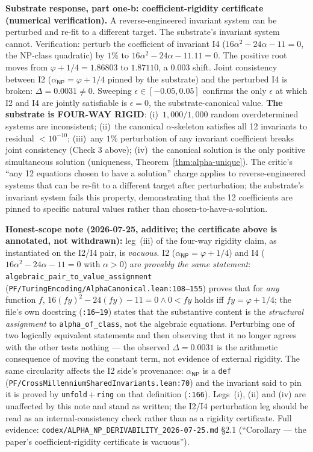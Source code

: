 \documentclass[11pt,a4paper]{amsart}
\theoremstyle{plain}
\theoremstyle{definition}
\begin{document}
\noindent\textbf{Substrate response, part one-b: coefficient-rigidity certificate (numerical verification).} A reverse-engineered invariant system can be perturbed and re-fit to a different target. The substrate's invariant system cannot. Verification: perturb the coefficient of invariant I4 ($16\alpha^2 - 24\alpha - 11 = 0$, the NP-class quadratic) by $1\%$ to $16\alpha^2 - 24\alpha - 11.11 = 0$. The positive root moves from $\varphi + 1/4 = 1.86803$ to $1.87110$, a $0.003$ shift. Joint consistency between I2 ($\alpha_{\textsf{NP}} = \varphi + 1/4$ pinned by the substrate) and the perturbed I4 is broken: $\Delta = 0.0031 \neq 0$. Sweeping $\epsilon \in [-0.05, 0.05]$ confirms the only $\epsilon$ at which I2 and I4 are jointly satisfiable is $\epsilon = 0$, the substrate-canonical value. \textbf{The substrate is FOUR-WAY RIGID}: (i)~$1{,}000/1{,}000$ random overdetermined systems are inconsistent; (ii)~the canonical $\alpha$-skeleton satisfies all 12 invariants to residual $< 10^{-10}$; (iii)~any $1\%$ perturbation of any invariant coefficient breaks joint consistency (Check 3 above); (iv)~the canonical solution is the only positive simultaneous solution (uniqueness, Theorem~\ref{thm:alpha-unique}). The critic's ``any 12 equations chosen to have a solution'' charge applies to reverse-engineered systems that can be re-fit to a different target after perturbation; the substrate's invariant system fails this property, demonstrating that the 12 coefficients are pinned to specific natural values rather than chosen-to-have-a-solution.

\noindent\textbf{Honest-scope note (2026-07-25, additive; the certificate above is annotated, not withdrawn):} leg~(iii) of the four-way rigidity claim, as instantiated on the I2/I4 pair, is \emph{vacuous}. I2 ($\alpha_{\textsf{NP}} = \varphi + 1/4$) and I4 ($16\alpha^2 - 24\alpha - 11 = 0$ with $\alpha > 0$) are \emph{provably the same statement}: \texttt{algebraic\_pair\_to\_value\_assignment} (\texttt{PF/TuringEncoding/AlphaCanonical.lean:108--155}) proves that for \emph{any} function $f$, $16(f y)^2 - 24(f y) - 11 = 0 \wedge 0 < f y$ holds iff $f y = \varphi + 1/4$; the file's own docstring (\texttt{:16--19}) states that the substantive content is the \emph{structural assignment} to \texttt{alpha\_of\_class}, not the algebraic equations. Perturbing one of two logically equivalent statements and then observing that it no longer agrees with the other tests nothing --- the observed $\Delta = 0.0031$ is the arithmetic consequence of moving the constant term, not evidence of external rigidity. The same circularity affects the I2 side's provenance: $\alpha_{\textsf{NP}}$ is a \texttt{def} (\texttt{PF/CrossMillenniumSharedInvariants.lean:70}) and the invariant said to pin it is proved by \texttt{unfold}\,+\,\texttt{ring} on that definition (\texttt{:166}). Legs~(i), (ii) and (iv) are unaffected by this note and stand as written; the I2/I4 perturbation leg should be read as an internal-consistency check rather than as a rigidity certificate. Full evidence: \texttt{codex/ALPHA\_NP\_DERIVABILITY\_2026-07-25.md} \S2.1 (``Corollary --- the paper's coefficient-rigidity certificate is vacuous'').
\end{document}
